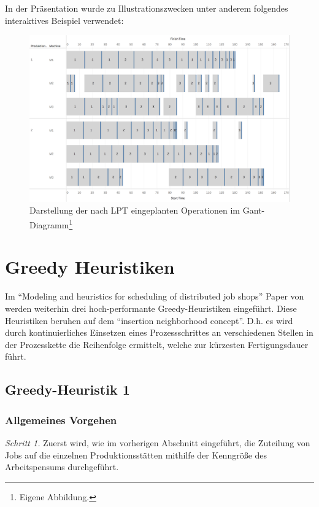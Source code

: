 \documentclass[final, english, ngerman, a4paper, 12pt, %
numbers=noenddot,
cd=true,
cdfont=false,cdfont=nohead,cdfont=nodin,
cdmath=false,
cdhead=false,
cdfoot=true,
cdcover=monochrome,
cdgeometry=symmetric,
declaration=heading,
declaration=notoc,
abstract=heading,
]{tudscrreprt}
\begin{document}
\noindent
In der Präsentation wurde zu Illustrationszwecken unter anderem folgendes interaktives Beispiel verwendet:
\begin{figure}[H]
	\centering
	\includegraphics[width=\textwidth]{./settings/lpt}
	\caption[Interaktives Beispiel - Einplanung nach der LPT Regel]{Darstellung der nach LPT eingeplanten Operationen im Gant-Diagramm\footnote{Eigene Abbildung.}}\label{fig:spt}
\end{figure}


\section{Greedy Heuristiken}

Im “Modeling and heuristics for scheduling of distributed job shops” Paper von \cite{djs-modeling} werden weiterhin drei hoch-performante Greedy-Heuristiken eingeführt. Diese Heuristiken beruhen auf dem “insertion neighborhood concept”. D.h. es wird durch kontinuierliches Einsetzen eines Prozessschrittes an verschiedenen Stellen in der Prozesskette die Reihenfolge ermittelt, welche zur kürzesten Fertigungsdauer führt.

\subsection{Greedy-Heuristik 1}

\subsubsection{Allgemeines Vorgehen}
\noindent
\textit{Schritt 1.} Zuerst wird, wie im vorherigen Abschnitt eingeführt, die Zuteilung von Jobs auf die einzelnen Produktionsstätten mithilfe der Kenngröße des Arbeitspensums durchgeführt.\\
\end{document}
